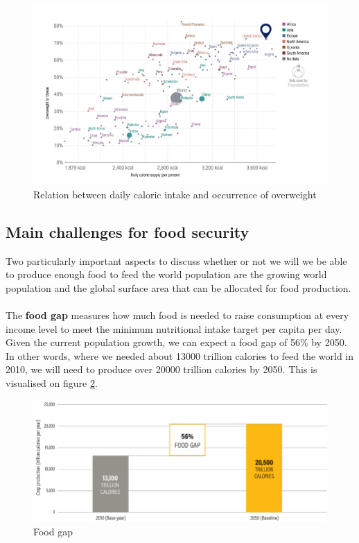 \documentclass[../summary.tex]{subfiles}
\begin{document}
	\begin{figure} [htbp]
		\centering
		\includegraphics[width=0.9\linewidth]{images/6-obesity-and-caloric-intake.png}
		\caption{Relation between daily caloric intake and occurrence of overweight}
		\label{fig:obesity-and-caloric-intak}
	\end{figure}
	
	\subsection{Main challenges for food security}
	
	Two particularly important aspects to discuss whether or not we will we be able to produce enough food to feed the world population are the growing world population and the global surface area that can be allocated for food production. 
	\\\\
	The \textbf{food gap} measures how much food is needed to raise consumption at every income level to meet the minimum nutritional intake target per capita per day. Given the current population growth, we can expect a food gap of 56\% by 2050. In other words, where we needed about 13000 trillion calories to feed the world in 2010, we will need to produce over 20000 trillion calories by 2050. This is visualised on figure \ref{fig:food_gap}.
	
	\begin{figure}[htbp]
		\centering
		\includegraphics[width=1\linewidth]{images/6-food-gap.png}
		\caption{Food gap}
		\label{fig:food_gap}
	\end{figure}
	
\end{document}
